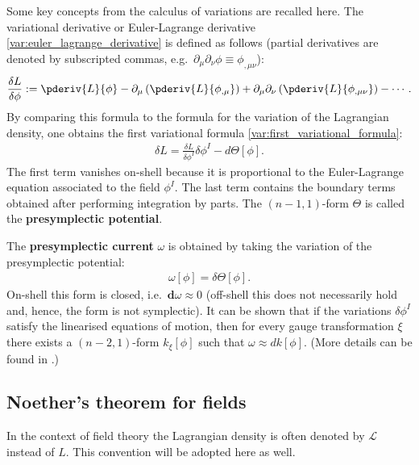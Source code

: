     Some key concepts from the calculus of variations are recalled here. The variational derivative or Euler-Lagrange derivative \eqref{var:euler_lagrange_derivative} is defined as follows (partial derivatives are denoted by subscripted commas, e.g.~$\partial_\mu\partial_\nu\phi\equiv\phi_{,\mu\nu}$):
    \begin{gather}
        \frac{\delta L}{\delta \phi} := \pderiv{L}{\phi} - \partial_\mu\left(\pderiv{L}{\phi_{,\mu}}\right) + \partial_\mu\partial_\nu\left(\pderiv{L}{\phi_{,\mu\nu}}\right) -\cdots.
    \end{gather}
    By comparing this formula to the formula for the variation of the Lagrangian density, one obtains the first variational formula \eqref{var:first_variational_formula}:
    \begin{gather}
        \delta L = \frac{\delta L}{\delta \phi^I}\delta\phi^I - d\Theta[\phi].
    \end{gather}
    The first term vanishes on-shell because it is proportional to the Euler-Lagrange equation associated to the field $\phi^I$. The last term contains the boundary terms obtained after performing integration by parts. The $(n-1,1)$-form $\Theta$ is called the \textbf{presymplectic potential}.

    The \textbf{presymplectic current} $\omega$ is obtained by taking the variation of the presymplectic potential:
    \begin{gather}
        \omega[\phi] = \delta\Theta[\phi].
    \end{gather}
    On-shell this form is closed, i.e.~$\mathbf{d}\omega\approx0$ (off-shell this does not necessarily hold and, hence, the form is not symplectic). It can be shown that if the variations $\delta\phi^I$ satisfy the linearised equations of motion, then for every gauge transformation $\xi$ there exists a $(n-2,1)$-form $k_\xi[\phi]$ such that $\omega\approx dk[\phi]$. (More details can be found in \cite{compere}.)

\subsection{Noether's theorem for fields}

    In the context of field theory the Lagrangian density is often denoted by $\mathcal{L}$ instead of $L$. This convention will be adopted here as well.


